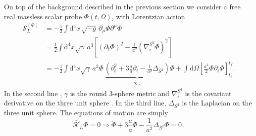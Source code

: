 \documentclass[a4paper,11pt]{article}
\begin{document}
On top of the background described in the previous section we consider a free real massless scalar probe $\Phi(t,\Omega)$, with Lorentzian action
\begin{equation}\label{eq:action_probe}
\begin{aligned}
\mathcal{S}_L^{(\Phi)}
&=-\frac{1}{2}\int \mathrm{d}^4x\,\sqrt{-g}\,
\partial_{\mu}\Phi\partial^{\mu}\Phi
\\
&=\frac{1}{2}\int \mathrm{d}^4x \sqrt{\gamma}\,a^3 
\left[
(\partial_t\Phi)^2
-\frac{1}{a^2}\left(\nabla^{S^3}_i\Phi\right)^2
\right]
\\
&=-\frac{1}{2}\int \mathrm{d}^4x \sqrt{\gamma} \,a^3  \Phi\,
\underbrace{
\left(
\partial_t^2
+3\frac{\dot{a}}{a}\partial_t
-\frac{1}{a^2}\Delta_{S^3}
\right)
}_{\displaystyle \widehat{\mathcal{K}}_L}
\Phi
+\int \mathrm{d}\Omega
\left[
\frac{a^3}{2}\Phi\partial_t\Phi
\right]_{t_i}^{t_f}.
\end{aligned}
\end{equation}
In the second line , $\gamma$ is the round 3-sphere metric and $\nabla^{S^3}_i$ is the covariant derivative on the three unit sphere . In the third line, $\Delta_{S^3}$ is the Laplacian on the three unit sphere. The equations of motion are simply
\begin{equation}\label{eq:Lorentzian_eom_probe}
    {\displaystyle \widehat{\mathcal{K}}_L}\Phi=0 \Rightarrow\ddot{\Phi}+3\frac{\dot{a}}{a}\dot{\Phi} -\frac{1}{a^2}\Delta_{S^3}\Phi=0\,.
\end{equation}
\end{document}
